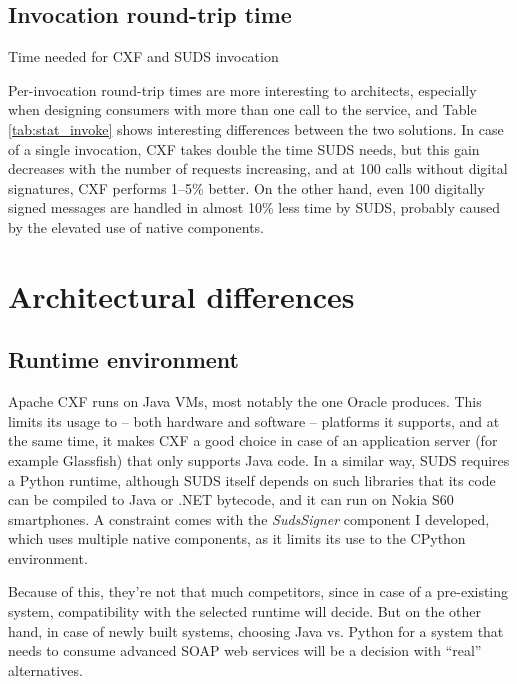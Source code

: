 \subsection{Invocation round-trip time}

\begin{table}[htbp]
 \begin{center}
  
  \caption{Time needed for CXF and SUDS invocation}
  \label{tab:stat_invoke}
 \end{center}
\end{table}

\noindent
Per-invocation round-trip times are more interesting to architects, especially when designing consumers with more than one call to the service, and Table \ref{tab:stat_invoke} shows interesting differences between the two solutions. In case of a single invocation, CXF takes double the time SUDS needs, but this gain decreases with the number of requests increasing, and at 100 calls without digital signatures, CXF performs 1--5\% better. On the other hand, even 100 digitally signed messages are handled in almost 10\% less time by SUDS, probably caused by the elevated use of native components.

\section{Architectural differences}

\subsection{Runtime environment}

Apache CXF runs on Java VMs, most notably the one Oracle produces. This limits its usage to -- both hardware and software -- platforms it supports, and at the same time, it makes CXF a good choice in case of an application server (for example Glassfish) that only supports Java code. In a similar way, SUDS requires a Python runtime, although SUDS itself depends on such libraries that its code can be compiled to Java or .NET bytecode, and it can run on Nokia S60 smartphones. A constraint comes with the \emph{SudsSigner} component I developed, which uses multiple native components, as it limits its use to the CPython environment.

Because of this, they're not that much competitors, since in case of a pre-existing system, compatibility with the selected runtime will decide. But on the other hand, in case of newly built systems, choosing Java vs. Python for a system that needs to consume advanced SOAP web services will be a decision with ``real'' alternatives.

